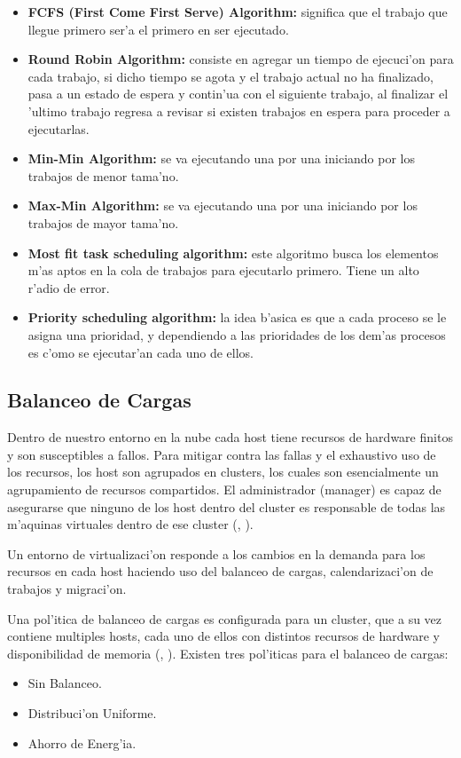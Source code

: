 \begin{itemize}
	\item \textbf{FCFS (First Come First Serve) Algorithm:} significa que el trabajo que llegue primero ser'a el primero en ser ejecutado.
	\item \textbf{Round Robin Algorithm:} consiste en agregar un tiempo de ejecuci'on para cada trabajo, si dicho tiempo se agota y el trabajo actual no ha finalizado, pasa a un estado de espera y contin'ua con el siguiente trabajo, al finalizar el 'ultimo trabajo regresa a revisar si existen trabajos en espera para proceder a ejecutarlas. 
	\item  \textbf{Min-Min Algorithm:} se va ejecutando una por una iniciando por los trabajos de menor tama'no.
	\item  \textbf{Max-Min Algorithm:} se va ejecutando una por una iniciando por los trabajos de mayor tama'no.
	\item  \textbf{Most fit task scheduling algorithm:} este algoritmo busca los elementos m'as aptos en la cola de trabajos para ejecutarlo primero. Tiene un alto r'adio de error.
	\item \textbf{Priority scheduling algorithm:} la idea b'asica es que a cada proceso se le asigna una prioridad, y dependiendo a las prioridades de los dem'as procesos es c'omo se ejecutar'an cada uno de ellos.
\end{itemize}

\subsection*{Balanceo de Cargas}

Dentro de nuestro entorno en la nube cada host tiene recursos de hardware finitos y son susceptibles a fallos. Para mitigar contra las fallas y el exhaustivo uso de los recursos, los host son agrupados en clusters, los cuales son esencialmente un agrupamiento de recursos compartidos. El administrador (manager) es capaz de asegurarse que ninguno de los host dentro del cluster es responsable de todas las m'aquinas virtuales dentro de ese cluster (\citeauthor{redhat}, \citeyear{redhat}).

Un entorno de virtualizaci'on responde a los cambios en la demanda para los recursos en cada host haciendo uso del balanceo de cargas, calendarizaci'on de trabajos y migraci'on.

Una pol'itica de balanceo de cargas es configurada para un cluster, que a su vez contiene multiples hosts, cada uno de ellos con distintos recursos de hardware y disponibilidad de memoria (\citeauthor{redhat}, \citeyear{redhat}). 
Existen tres pol'iticas para el balanceo de cargas:
\begin{itemize}
	\item Sin Balanceo.
	\item Distribuci'on Uniforme.
	\item Ahorro de Energ'ia.
\end{itemize}

